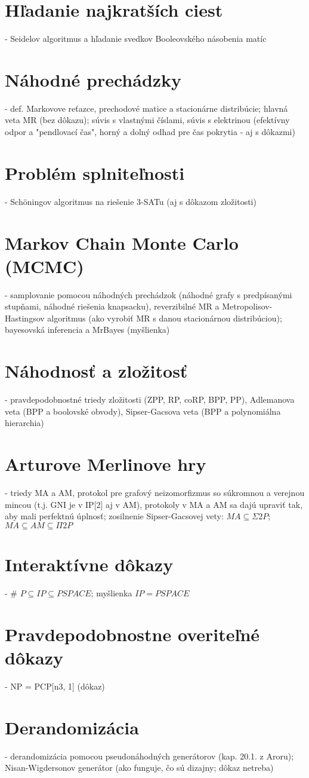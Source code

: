\documentclass[12pt,a4paper]{article}
\begin{document}
\section{Hľadanie najkratších ciest}
 - Seidelov algoritmus a hľadanie svedkov Booleovského násobenia matíc
 

\section{Náhodné prechádzky}
 - def. Markovove reťazce, prechodové matice a stacionárne distribúcie; hlavná veta MR (bez dôkazu); súvis s vlastnými číslami, súvis s elektrinou (efektívny odpor a "pendlovací čas", horný a dolný odhad pre čas pokrytia - aj s dôkazmi)
 

\section{Problém splniteľnosti}
 - Schöningov algoritmus na riešenie 3-SATu (aj s dôkazom zložitosti)
 

\section{Markov Chain Monte Carlo (MCMC)}
 - samplovanie pomocou náhodných prechádzok (náhodné grafy s predpísanými stupňami, náhodné riešenia knapsacku), reverzibilné MR a Metropolisov-Hastingsov algoritmus (ako vyrobiť MR s danou stacionárnou distribúciou); bayesovská inferencia a MrBayes (myšlienka)
 

\section{Náhodnosť a zložitosť}
 - pravdepodobnostné triedy zložitosti (ZPP, RP, coRP, BPP, PP), Adlemanova veta (BPP a boolovské obvody), Sipser-Gacsova veta (BPP a polynomiálna hierarchia)
 

\section{Arturove Merlinove hry}
 - triedy MA a AM, protokol pre grafový neizomorfizmus so súkromnou a verejnou mincou (t.j. GNI je v IP[2] aj v AM), protokoly v MA a AM sa dajú upraviť tak, aby mali perfektnú úplnosť; zosilnenie Sipser-Gacsovej vety: $MA \subseteq \Sigma 2P$; $MA \subseteq AM \subseteq \Pi 2P$
 

\section{Interaktívne dôkazy}
 - \# $P \subseteq IP \subseteq PSPACE$; myšlienka $IP = PSPACE$
 

\section{Pravdepodobnostne overiteľné dôkazy}
 - NP = PCP[n3, 1] (dôkaz)
 

\section{Derandomizácia} 
- derandomizácia pomocou pseudonáhodných generátorov (kap. 20.1. z Aroru); Nisan-Wigdersonov generátor (ako funguje, čo sú dizajny; dôkaz netreba)
\end{document}
